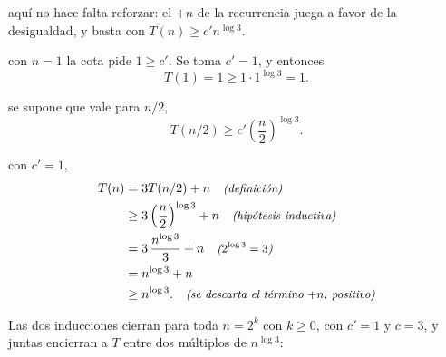 \documentclass[11pt,letterpaper]{article}
\begin{document}
 aquí no hace falta reforzar: el $+n$ de la
recurrencia juega a favor de la desigualdad, y basta con
$T(n) \ge c'n^{\log 3}$.

 con $n = 1$ la cota pide $1 \ge c'$. Se toma
$c' = 1$, y entonces
\[
  T(1) = 1 \ge 1 \cdot 1^{\log 3} = 1.
\]

 se supone que vale para $n/2$,
\[
  T(n/2) \ge c'\left(\frac{n}{2}\right)^{\log 3}.
\]

 con $c' = 1$,
\begin{align*}
  T(n) &= 3T(n/2) + n \quad\text{\small\itshape (definición)} \\
       &\ge 3\left(\frac{n}{2}\right)^{\log 3} + n
          \quad\text{\small\itshape (hipótesis inductiva)} \\
       &= 3\,\frac{n^{\log 3}}{3} + n \quad\text{\small\itshape ($2^{\log 3} = 3$)} \\
       &= n^{\log 3} + n \\
       &\ge n^{\log 3}. \quad\text{\small\itshape (se descarta el término $+n$, positivo)}
\end{align*}

Las dos inducciones cierran para toda $n = 2^k$ con $k \ge 0$, con
$c' = 1$ y $c = 3$, y juntas encierran a $T$ entre dos múltiplos de
$n^{\log 3}$:
\end{document}
